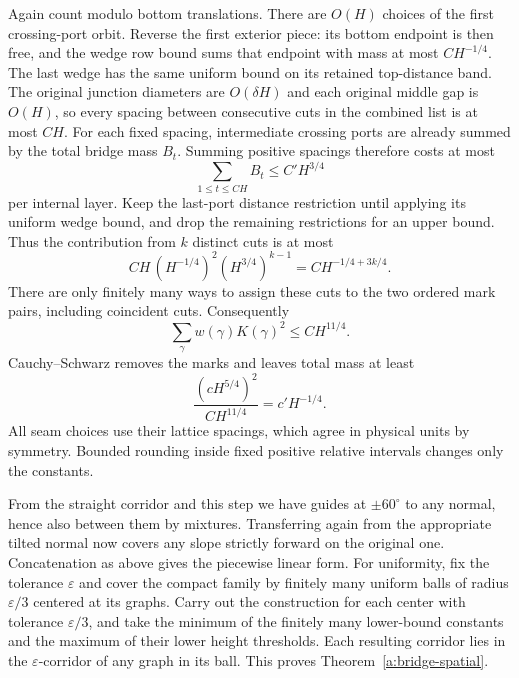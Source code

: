 Again count modulo bottom translations. There are $O(H)$ choices
of the first crossing-port orbit. Reverse the first exterior piece:
its bottom endpoint is then free, and the wedge row bound sums that
endpoint with mass at most $CH^{-1/4}$. The last wedge has the same
uniform bound on its retained top-distance band. The original
junction diameters are $O(\delta H)$ and each original middle gap
is $O(H)$, so every spacing between consecutive cuts in the combined
list is at most $CH$. For each fixed spacing, intermediate crossing
ports are already summed by the total bridge mass $B_t$. Summing
positive spacings therefore costs at most
\[
 \sum_{1\le t\le CH}B_t\le C'H^{3/4}
\]
per internal layer. Keep the last-port distance restriction until
applying its uniform wedge bound, and drop the remaining restrictions
for an upper bound. Thus the contribution from $k$ distinct cuts is
at most
\[
 CH\,(H^{-1/4})^2(H^{3/4})^{k-1}
                      =CH^{-1/4+3k/4}.
\]
There are only finitely many ways to assign these cuts to the two
ordered mark pairs, including coincident cuts. Consequently
\[
 \sum_\gamma w(\gamma)K(\gamma)^2\le CH^{11/4}.
\]
Cauchy--Schwarz removes the marks and leaves total mass at least
\[
 \frac{(cH^{5/4})^2}{CH^{11/4}}=c'H^{-1/4}.
\]
All seam choices use their lattice spacings, which agree in physical
units by symmetry. Bounded rounding inside fixed positive relative
intervals changes only the constants.

From the straight corridor and this step we have guides at \(\pm60^\circ\) to any normal, hence also between them by mixtures. Transferring again from the appropriate tilted normal now covers any slope strictly forward on the original one. Concatenation as above gives the piecewise linear form. For uniformity, fix the tolerance $\varepsilon$ and cover the compact
family by finitely many uniform balls of radius $\varepsilon/3$ centered
at its graphs. Carry out the construction for each center with tolerance
$\varepsilon/3$, and take the minimum of the finitely many lower-bound
constants and the maximum of their lower height thresholds. Each
resulting corridor lies in the $\varepsilon$-corridor of any graph in its ball. This proves Theorem~\ref{a:bridge-spatial}.
